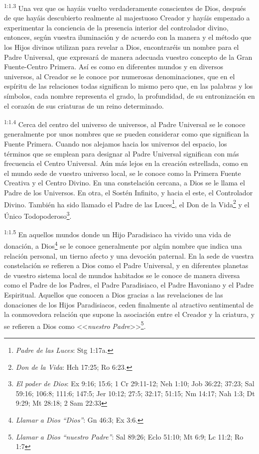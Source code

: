 \par
\textsuperscript{1:1.3} Una vez que os hayáis vuelto verdaderamente conscientes de Dios, después de que hayáis descubierto realmente al majestuoso Creador y hayáis empezado a experimentar la conciencia de la presencia interior del controlador divino, entonces, según vuestra iluminación y de acuerdo con la manera y el método que los Hijos divinos utilizan para revelar a Dios, encontraréis un nombre para el Padre Universal, que expresará de manera adecuada vuestro concepto de la Gran Fuente-Centro Primera. Así es como en diferentes mundos y en diversos universos, al Creador se le conoce por numerosas denominaciones, que en el espíritu de las relaciones todas significan lo mismo pero que, en las palabras y los símbolos, cada nombre representa el grado, la profundidad, de su entronización en el corazón de sus criaturas de un reino determinado.

\par
\textsuperscript{1:1.4} Cerca del centro del universo de universos, al Padre Universal se le conoce generalmente por unos nombres que se pueden considerar como que significan la Fuente Primera. Cuando nos alejamos hacia los universos del espacio, los términos que se emplean para designar al Padre Universal significan con más frecuencia el Centro Universal. Aún más lejos en la creación estrellada, como en el mundo sede de vuestro universo local, se le conoce como la Primera Fuente Creativa y el Centro Divino. En una constelación cercana, a Dios se le llama el Padre de los Universos. En otra, el Sostén Infinito, y hacia el este, el Controlador Divino. También ha sido llamado el Padre de las Luces\footnote{\textit{Padre de las Luces}: Stg 1:17a.}, el Don de la Vida\footnote{\textit{Don de la Vida}: Hch 17:25; Ro 6:23.} y el Único Todopoderoso\footnote{\textit{El poder de Dios}: Ex 9:16; 15:6; 1 Cr 29:11-12; Neh 1:10; Job 36:22; 37:23; Sal 59:16; 106:8; 111:6; 147:5; Jer 10:12; 27:5; 32:17; 51:15; Nm 14:17; Nah 1:3; Dt 9:29; Mt 28:18; 2 Sam 22:33}.

\par
\textsuperscript{1:1.5} En aquellos mundos donde un Hijo Paradisiaco ha vivido una vida de donación, a Dios\footnote{\textit{Llamar a Dios ``Dios''}: Gn 46:3; Ex 3:6.} se le conoce generalmente por algún nombre que indica una relación personal, un tierno afecto y una devoción paternal. En la sede de vuestra constelación se refieren a Dios como el Padre Universal, y en diferentes planetas de vuestro sistema local de mundos habitados se le conoce de manera diversa como el Padre de los Padres, el Padre Paradisiaco, el Padre Havoniano y el Padre Espiritual. Aquellos que conocen a Dios gracias a las revelaciones de las donaciones de los Hijos Paradisiacos, ceden finalmente al atractivo sentimental de la conmovedora relación que supone la asociación entre el Creador y la criatura, y se refieren a Dios como <<\textit{nuestro Padre}>>\footnote{\textit{Llamar a Dios ``nuestro Padre''}: Sal 89:26; Eclo 51:10; Mt 6:9; Lc 11:2; Ro 1:7}.

